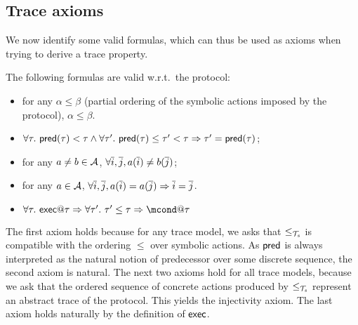 \subsection{Trace axioms}

We now identify some valid formulas, which can thus be used as axioms
when trying to derive a trace property.

\begin{proposition}
  The following formulas are valid w.r.t.\ the protocol:
  \begin{itemize}
    \item for any $\alpha \leq \beta$ (partial ordering of the symbolic actions imposed by the protocol), $\alpha \leq \beta$.

    \item
      $\forall \tau.~ \textsf{pred}(\tau)<\tau \wedge
      \forall \tau'.~ \textsf{pred}(\tau)\leq\tau'<\tau \Rightarrow
      \tau'=\textsf{pred}(\tau)$;
    \item for any $a\neq b\in\mathcal{A}$,
      $\forall \overline{i},\overline{j}, a(\overline{i})\neq b(\overline{j})$;
    \item for any $a\in\mathcal{A}$,
      $\forall \overline{i},\overline{j}, a(\overline{i})=a(\overline{j}) \Rightarrow \overline{i}=\overline{j}$.
      \item $\forall \tau.~ \mexec@\tau \Rightarrow \forall \tau'.~\tau'\leq \tau \Rightarrow \mcond@\tau$
  \end{itemize}
\end{proposition}


The first axiom holds because for any trace model, we asks that $\leq_{\mathcal{T}_s}$ is compatible with the ordering $\leq$ over symbolic actions.
As $\textsf{pred}$ is always interpreted as the natural notion of predecessor over some discrete sequence, the second axiom is natural. The next two axioms hold for all trace models, because we ask that the ordered sequence of concrete actions produced by $\leq_{\mathcal{T}_s}$ represent an abstract trace of the protocol. This yields the injectivity axiom. The last axiom holds naturally by the definition of $\textsf{exec}$.

